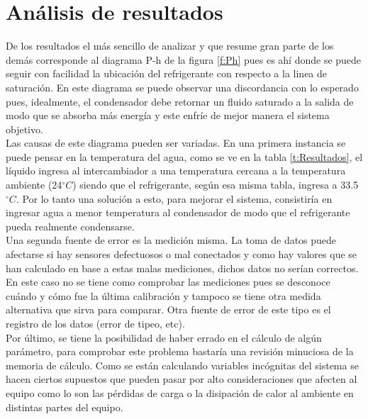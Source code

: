 \documentclass[11pt,letterpaper]{extarticle}        %
\numberwithin{equation}{section}                    %
\newcommand{\grados}{^{\circ}}                      %
\begin{document}
\section{Análisis de resultados}

De los resultados el más sencillo de analizar y que resume gran parte de los demás corresponde al diagrama P-h de la figura \ref{f:Ph} pues es ahí donde se puede seguir con facilidad la ubicación del refrigerante con respecto a la linea de saturación. En este diagrama se puede observar una discordancia con lo esperado pues, idealmente, el condensador debe retornar un fluido saturado a la salida de modo que se absorba más energía y este enfríe de mejor manera el sistema objetivo.\\

Las causas de este diagrama pueden ser variadas. En una primera instancia se puede pensar en la temperatura del agua, como se ve en la tabla \ref{t:Resultados}, el líquido ingresa al intercambiador a una temperatura cercana a la temperatura ambiente (24$\grados C$) siendo que el refrigerante, según esa misma tabla, ingresa a 33.5$\grados C$. Por lo tanto una solución a esto, para mejorar el sistema, consistiría en ingresar agua a menor temperatura al condensador de modo que el refrigerante pueda realmente condensarse.\\

Una segunda fuente de error es la medición misma. La toma de datos puede afectarse si hay sensores defectuosos o mal conectados y como hay valores que se han calculado en base a estas malas mediciones, dichos datos no serían correctos. En este caso no se tiene como comprobar las mediciones pues se desconoce cuándo y cómo fue la última calibración y tampoco se tiene otra medida alternativa que sirva para comparar. Otra fuente de error de este tipo es el registro de los datos (error de tipeo, etc).\\

Por último, se tiene la posibilidad de haber errado en el cálculo de algún parámetro, para comprobar este problema bastaría una revisión minuciosa de la memoria de cálculo. Como se están calculando variables incógnitas del sistema se hacen ciertos supuestos que pueden pasar por alto consideraciones que afecten al equipo como lo son las pérdidas de carga o la disipación de calor al ambiente en distintas partes del equipo.\\
\end{document}
